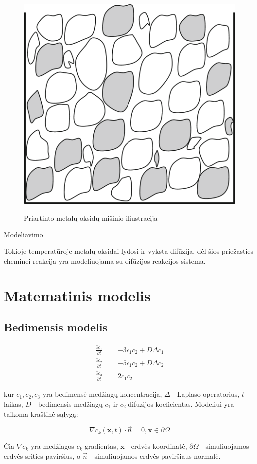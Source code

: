 \documentclass{VUMIFInfKursinis}
\begin{document}
\begin{figure}[h]
  \centering
  \includegraphics[width=0.25\linewidth]{assets/metal_oxides_mixture.png}
  \label{fig:metal-oxides-mixuter}
  \caption{Priartinto metalų oksidų mišinio iliustracija \cite{}}
\end{figure}

Modeliavimo 

Tokioje temperatūroje metalų oksidai lydosi ir vyksta difūzija, dėl šios priežasties cheminei reakcija yra modeliuojama su difūzijos-reakcijos sistema.

\section{Matematinis modelis}

\subsection{Bedimensis modelis}

\begin{subequations} \label{nodim}
    \begin{align}
    \frac{\partial c_1}{\partial t}&=-3c_1c_2+D\Delta c_1 \label{nodim1}\\
    \frac{\partial c_2}{\partial t}&=-5c_1c_2+D\Delta c_2 \label{nodim2}\\
    \frac{\partial c_3}{\partial t}&=2c_1c_2
    \end{align}
\end{subequations}

kur $c_1,c_2,c_3$ yra bedimensė medžiagų koncentracija, 
$\Delta$ - Laplaso operatorius, $t$ - laikas, 
$D$ - bedimensis medžiagų $c_1$ ir $c_2$ difuzijos koeficientas. Modeliui yra taikoma kraštinė sąlygą:

\begin{equation} \label{general-boundary-cond}
  \nabla c_k(\textbf{x}, t)\cdot\vec{n}=0, \textbf{x}\in\partial\Omega
\end{equation}

Čia $\nabla c_k$ yra medžiagos $c_k$ gradientas, $\textbf{x}$ - erdvės koordinatė, $\partial\Omega$ - simuliuojamos erdvės srities paviršius, o $\vec{n}$ - simuliuojamos erdvės paviršiaus normalė.
\end{document}
